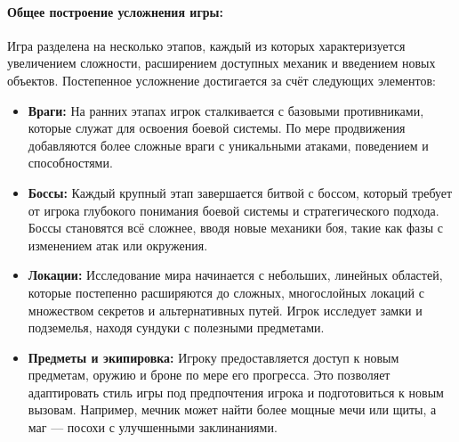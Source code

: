 \documentclass{article}
\begin{document}
\paragraph{Общее построение усложнения игры:}
Игра разделена на несколько этапов, каждый из которых характеризуется увеличением сложности, расширением доступных механик и введением новых объектов. Постепенное усложнение достигается за счёт следующих элементов:
\begin{itemize}
    \item \textbf{Враги:} На ранних этапах игрок сталкивается с базовыми противниками, которые служат для освоения боевой системы. По мере продвижения добавляются более сложные враги с уникальными атаками, поведением и способностями.
    \item \textbf{Боссы:} Каждый крупный этап завершается битвой с боссом, который требует от игрока глубокого понимания боевой системы и стратегического подхода. Боссы становятся всё сложнее, вводя новые механики боя, такие как фазы с изменением атак или окружения.
    \item \textbf{Локации:} Исследование мира начинается с небольших, линейных областей, которые постепенно расширяются до сложных, многослойных локаций с множеством секретов и альтернативных путей. Игрок исследует замки и подземелья, находя сундуки с полезными предметами.
    \item \textbf{Предметы и экипировка:} Игроку предоставляется доступ к новым предметам, оружию и броне по мере его прогресса. Это позволяет адаптировать стиль игры под предпочтения игрока и подготовиться к новым вызовам. Например, мечник может найти более мощные мечи или щиты, а маг — посохи с улучшенными заклинаниями.
\end{itemize}
\end{document}
